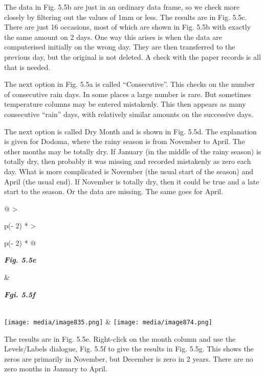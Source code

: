 \documentclass[
  letterpaper,
  DIV=11,
  numbers=noendperiod]{scrreprt}
\begin{document}
The data in Fig. 5.5b are just in an ordinary data frame, so we check
more closely by filtering out the values of 1mm or less. The results are
in Fig. 5.5c. There are just 16 occasions, most of which are shown in
Fig. 5.5b with exactly the same amount on 2 days. One way this arises is
when the data are computerised initially on the wrong day. They are then
transferred to the previous day, but the original is not deleted. A
check with the paper records is all that is needed.

The next option in Fig. 5.5a is called ``Consecutive''. This checks on
the number of consecutive rain days. In some places a large number is
rare. But sometimes temperature columns may be entered mistakenly. This
then appears as many consecutive ``rain'' days, with relatively similar
amounts on the successive days.

The next option is called Dry Month and is shown in Fig. 5.5d. The
explanation is given for Dodoma, where the rainy season is from November
to April. The other months may be totally dry. If January (in the middle
of the rainy season) is totally dry, then probably it was missing and
recorded mistakenly as zero each day. What is more complicated is
November (the usual start of the season) and April (the usual end). If
November is totally dry, then it could be true and a late start to the
season. Or the data are missing. The same goes for April.

\begin{longtable}[]{@{}
  >{\raggedright\arraybackslash}p{(\columnwidth - 2\tabcolsep) * }
  >{\raggedright\arraybackslash}p{(\columnwidth - 2\tabcolsep) * }@{}}
\toprule\noalign{}
\begin{minipage}[b]{\linewidth}\raggedright
\textbf{\emph{Fig. 5.5e}}
\end{minipage} & \begin{minipage}[b]{\linewidth}\raggedright
\textbf{\emph{Fgi. 5.5f}}
\end{minipage} \\
\midrule\noalign{}
\endhead
\bottomrule\noalign{}
\endlastfoot
\texttt{[image: media/image835.png]} &
\texttt{[image: media/image874.png]} \\
\end{longtable}

The results are in Fig. 5.5e. Right-click on the month column and use
the Levels/Labels dialogue, Fig. 5.5f to give the results in Fig. 5.5g.
This shows the zeros are primarily in November, but December is zero in
2 years. There are no zero months in January to April.
\end{document}
